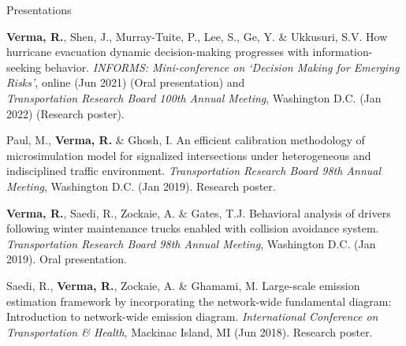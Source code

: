 \documentclass{CV} %
\begin{document}
\begin{rSection}{Presentations}
\begin{etaremune}
        \item \textbf{Verma, R.}, Shen, J., Murray-Tuite, P., Lee, S., Ge, Y. \& Ukkusuri, S.V. How hurricane evacuation dynamic decision-making progresses with information-seeking behavior. \textit{INFORMS: Mini-conference on `Decision Making for Emerging Risks'}, online (Jun 2021) (Oral presentation) and
        \\ \textit{Transportation Research Board 100th Annual Meeting}, Washington D.C. (Jan 2022) (Research poster).
    
        \item Paul, M., \textbf{Verma, R.} \& Ghosh, I. An efficient calibration methodology of microsimulation model for signalized intersections under heterogeneous and indisciplined traffic environment. \textit{Transportation Research Board 98th Annual Meeting}, Washington D.C. (Jan 2019). Research poster.
        
        \item \textbf{Verma, R.}, Saedi, R., Zockaie, A. \& Gates, T.J. Behavioral analysis of drivers following winter maintenance trucks enabled with collision avoidance system. \textit{Transportation Research Board 98th Annual Meeting}, Washington D.C. (Jan 2019). Oral presentation.

        \item Saedi, R., \textbf{Verma, R.}, Zockaie, A. \& Ghamami, M. Large-scale emission estimation framework by incorporating the network-wide fundamental diagram: Introduction to network-wide emission diagram. \textit{International Conference on Transportation \& Health}, Mackinac Island, MI (Jun 2018). Research poster.
    \end{etaremune}
\end{rSection}
\end{document}
